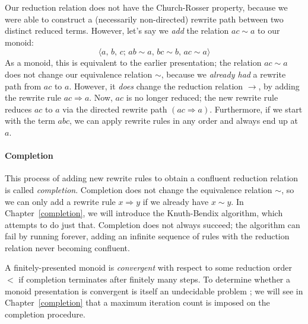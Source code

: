 \documentclass[../generics]{subfiles}
\begin{document}
\begin{example}
\begin{quote}
\end{quote}
Our reduction relation does not have the Church-Rosser property, because we were able to construct a (necessarily non-directed) rewrite path between two distinct reduced terms. However, let's say we \emph{add} the relation $ac\sim a$ to our monoid:
\[\langle a,\,b,\,c;\,ab\sim a,\,bc\sim b,\,ac\sim a\rangle\]
As a monoid, this is equivalent to the earlier presentation; the relation $ac\sim a$ does not change our equivalence relation $\sim$, because we \emph{already had} a rewrite path from $ac$ to $a$. However, it \emph{does} change the reduction relation $\rightarrow$, by adding the rewrite rule $ac\Rightarrow a$. Now, $ac$ is no longer reduced; the new rewrite rule reduces $ac$ to $a$ via the directed rewrite path $(ac\Rightarrow a)$. Furthermore, if we start with the term $abc$, we can apply rewrite rules in any order and always end up at $a$.
\end{example}
\paragraph{Completion} This process of adding new rewrite rules to obtain a confluent reduction relation is called \emph{completion}. Completion does not change the equivalence relation $\sim$, so we can only add a rewrite rule $x\Rightarrow y$ if we already have $x\sim y$. In Chapter~\ref{completion}, we will introduce the Knuth-Bendix algorithm, which attempts to do just that. Completion does not always succeed; the algorithm can fail by running forever, adding an infinite sequence of rules with the reduction relation never becoming confluent.

A finitely-presented monoid is \emph{convergent} with respect to some reduction order $<$ if completion terminates after finitely many steps. To determine whether a monoid presentation is convergent is itself an undecidable problem \cite{ODUNLAING1983339}; we will see in Chapter~\ref{completion} that a maximum iteration count is imposed on the completion procedure.
\end{document}
